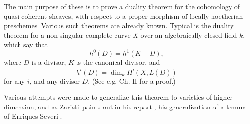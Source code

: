 The main purpose of these is to prove a duality theorem for the cohomology of quasi-coherent sheaves, with respect to a proper morphism of locally noetherian preschemes. Various such theorems are already known. Typical is the duality theorem for a non-singular complete curve $X$ over an algebraically closed field $k$, which say that
\[h^0(D)=h^1(K-D),\]
where $D$ is a divisor, $K$ is the canonical divisor, and 
\[h^{i}(D)=\dim_k H^i(X,L(D))\]
for any $i$, and any divisor $D$. (See e.g. \cite{s1959} Ch. II for a proof.) \par

Various attempts were made to generalize this theorem to varieties of higher dimension, and as Zariski points out in his report \cite{report1956}, his generalization of a lemma of Enriques-Severi \cite{z1952}.